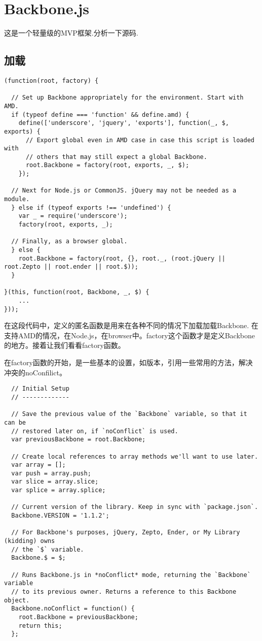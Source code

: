    \section{Backbone.js}
        这是一个轻量级的MVP框架.分析一下源码.

        \subsection{加载}
        
        \begin{lstlisting}
(function(root, factory) {

  // Set up Backbone appropriately for the environment. Start with AMD.
  if (typeof define === 'function' && define.amd) {
    define(['underscore', 'jquery', 'exports'], function(_, $, exports) {
      // Export global even in AMD case in case this script is loaded with
      // others that may still expect a global Backbone.
      root.Backbone = factory(root, exports, _, $);
    });

  // Next for Node.js or CommonJS. jQuery may not be needed as a module.
  } else if (typeof exports !== 'undefined') {
    var _ = require('underscore');
    factory(root, exports, _);

  // Finally, as a browser global.
  } else {
    root.Backbone = factory(root, {}, root._, (root.jQuery || root.Zepto || root.ender || root.$));
  }

}(this, function(root, Backbone, _, $) {
    ...
}));
        \end{lstlisting}

    在这段代码中，定义的匿名函数是用来在各种不同的情况下加载加载Backbone. 在支持AMD的情况，在Node.js，在browser中。factory这个函数才是定义Backbone的地方。接着让我们看看factory函数。


    在factory函数的开始，是一些基本的设置，如版本，引用一些常用的方法，解决冲突的noConfilict。



    \begin{lstlisting}
  // Initial Setup
  // -------------

  // Save the previous value of the `Backbone` variable, so that it can be
  // restored later on, if `noConflict` is used.
  var previousBackbone = root.Backbone;

  // Create local references to array methods we'll want to use later.
  var array = [];
  var push = array.push;
  var slice = array.slice;
  var splice = array.splice;

  // Current version of the library. Keep in sync with `package.json`.
  Backbone.VERSION = '1.1.2';

  // For Backbone's purposes, jQuery, Zepto, Ender, or My Library (kidding) owns
  // the `$` variable.
  Backbone.$ = $;

  // Runs Backbone.js in *noConflict* mode, returning the `Backbone` variable
  // to its previous owner. Returns a reference to this Backbone object.
  Backbone.noConflict = function() {
    root.Backbone = previousBackbone;
    return this;
  };
    \end{lstlisting}


